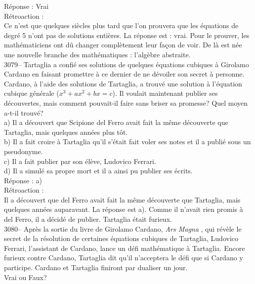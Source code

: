\documentclass[letterpaper, 12pt]{article}
\begin{document}
R\'eponse : Vrai\\

R\'etroaction :\\
Ce n'est que quelques si\`ecles plus tard que l'on prouvera que les \'equations de degr\'e 5 n'ont pas de solutions enti\`eres. La r\'eponse est : vrai. Pour le prouver, les math\'ematiciens ont d\^u changer compl\`etement leur fa\c con de voir. De l\`a est n\'ee une nouvelle branche des math\'ematiques : l'alg\`ebre abstraite.\\



3079-- Tartaglia a confi\'e ses solutions de quelques \'equations cubiques \`a Girolamo Cardano en faisant promettre \`a ce dernier de ne d\'evoiler son secret \`a personne. Cardano, \`a l'aide des solutions de Tartaglia, a trouv\'e une solution \`a l'\'equation cubique g\'en\'erale ($x^{3} + ax^{2} + bx =c$). Il voulait maintenant publier ses d\'ecouvertes, mais comment pouvait-il faire sans briser sa promesse? Quel moyen a-t-il trouv\'e?\\

a) Il a d\'ecouvert que Scipione del Ferro avait fait la m\^eme d\'ecouverte que Tartaglia, mais quelques ann\'ees plus t\^ot.\\
b) Il a fait croire \`a Tartaglia qu'il s'\'etait fait voler ses notes et il a publi\'e sous un pseudonyme.\\
c) Il a fait publier par son \'el\`eve, Ludovico Ferrari.\\
d) Il a simul\'e sa propre mort et il a ainsi pu publier ses \'ecrits.\\

R\'eponse : a)\\

R\'etroaction :\\
Il a d\'ecouvert que del Ferro avait fait la m\^eme d\'ecouverte que Tartaglia, mais quelques ann\'ees auparavant. La r\'eponse est a). Comme il n'avait rien promis \`a del Ferro, il a d\'ecid\'e de publier. Tartaglia \'etait furieux.\\



3080-- Apr\`es la sortie du livre de Girolamo Cardano, \og \emph{Ars Magna} \fg, qui r\'ev\`ele le secret de la r\'esolution de certaines \'equations cubiques de Tartaglia, Ludovico Ferrari, l'assistant de Cardano, lance un d\'efi math\'ematique \`a Tartaglia. Encore furieux contre Cardano, Tartaglia dit qu'il n'acceptera le d\'efi que si Cardano y participe. Cardano et Tartaglia finiront par dualiser un jour.\\
Vrai ou Faux?\\
\end{document}
